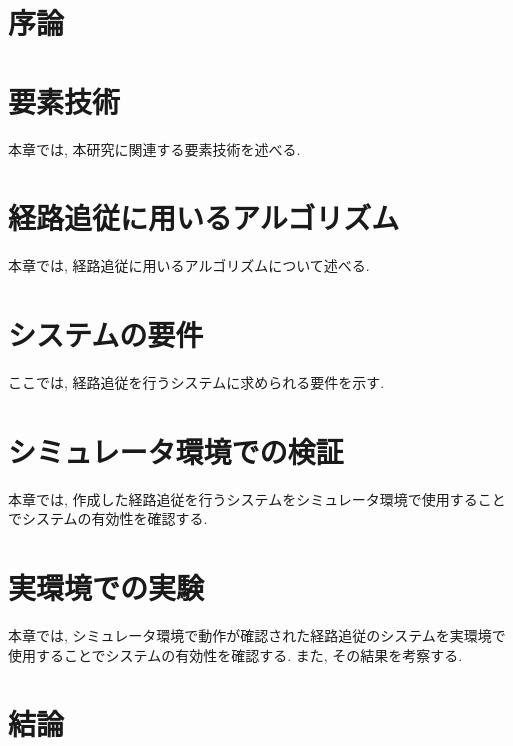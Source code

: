 \chapter{序論}
\label{chap:introduction}
%
%
%

\chapter{要素技術}
本章では, 本研究に関連する要素技術を述べる.

\chapter{経路追従に用いるアルゴリズム}
本章では, 経路追従に用いるアルゴリズムについて述べる.

\chapter{システムの要件}
ここでは, 経路追従を行うシステムに求められる要件を示す.

\chapter{シミュレータ環境での検証}
本章では, 作成した経路追従を行うシステムをシミュレータ環境で使用することでシステムの有効性を確認する.

\chapter{実環境での実験}
本章では, シミュレータ環境で動作が確認された経路追従のシステムを実環境で使用することでシステムの有効性を確認する.
また, その結果を考察する.

\chapter{結論}
